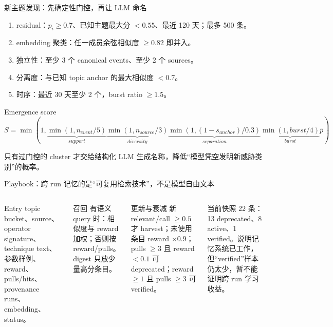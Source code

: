 \begin{frame}{新主题发现：先确定性门控，再让 LLM 命名}
\small
\begin{enumerate}
  \item residual：$p_i\ge0.7$、已知主题最大分 $<0.55$、最近 120 天；最多 500 条。
  \item embedding 聚类：任一成员余弦相似度 $\ge0.82$ 即并入。
  \item 独立性：至少 3 个 canonical events、至少 2 个 sources。
  \item 分离度：与已知 topic anchor 的最大相似度 $<0.7$。
  \item 时序：最近 30 天至少 2 个，burst ratio $\ge1.5$。
\end{enumerate}

\begin{block}{Emergence score}
\[
S=\min(1,\underbrace{\min(1,n_{event}/5)}_{support}
\underbrace{\min(1,n_{source}/3)}_{diversity}
\underbrace{\min(1,(1-s_{anchor})/0.3)}_{separation}
\underbrace{\min(1,burst/4)}_{burst}\bar p)
\]
\end{block}
只有过门控的 cluster 才交给结构化 LLM 生成名称，降低“模型凭空发明新威胁类别”的概率。
\end{frame}

\begin{frame}{Playbook：跨 run 记忆的是“可复用检索技术”，不是模型自由文本}
\begin{columns}[T,onlytextwidth]
\begin{block}{Entry}
topic bucket、source、operator signature、technique text、参数样例、reward、pulls/hits、provenance runs、embedding、status。
\end{block}
\begin{block}{召回}
有语义 query 时：相似度与 reward 加权；否则按 reward/pulls。digest 只放少量高分条目。
\end{block}
\begin{block}{更新与衰减}
新 relevant/call $\ge0.5$ 才 harvest；未使用条目 reward $\times0.9$；pulls $\ge3$ 且 reward $<0.1$ 可 deprecated；reward $\ge1$ 且 pulls $\ge3$ 可 verified。
\end{block}
\begin{alertblock}{当前快照}
22 条：13 deprecated、8 active、1 verified。说明记忆系统已工作，但“verified”样本仍太少，暂不能证明跨 run 学习收益。
\end{alertblock}
\end{columns}
\end{frame}

